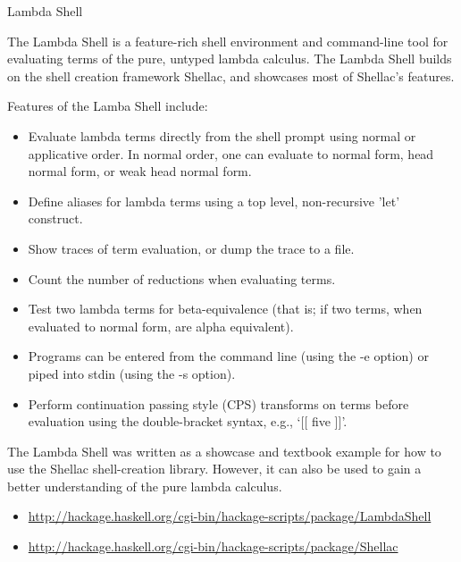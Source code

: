 \documentclass{article}
\begin{document}
\begin{hcarentry}{Lambda Shell}
\makeheader

The Lambda Shell is a feature-rich shell environment and command-line
tool for evaluating terms of the pure, untyped lambda calculus.  The Lambda
Shell builds on the shell creation framework Shellac, and showcases
most of Shellac's features.

Features of the Lamba Shell include:

\begin{itemize}
\item Evaluate lambda terms directly from the shell prompt using
      normal or applicative order.  In normal order, one can evaluate
      to normal form, head normal form, or weak head normal form.
\item Define aliases for lambda terms using a top level, non-recursive
      'let' construct.
\item Show traces of term evaluation, or dump the trace to a file.
\item Count the number of reductions when evaluating terms.
\item Test two lambda terms for beta-equivalence (that is; if two
      terms, when evaluated to normal form, are alpha equivalent).
\item Programs can be entered from the command line (using the -e option)
      or piped into stdin (using the -s option).
\item Perform continuation passing style (CPS) transforms on terms before
      evaluation using the double-bracket syntax, e.g.,  `[[ five ]]'.
\end{itemize}


The Lambda Shell was written as a showcase and textbook
example for how to use the Shellac shell-creation library.
However, it can also be used to gain a better understanding
of the pure lambda calculus.


\FurtherReading
\begin{itemize}
\item \url{http://hackage.haskell.org/cgi-bin/hackage-scripts/package/LambdaShell}
\item \url{http://hackage.haskell.org/cgi-bin/hackage-scripts/package/Shellac}
\end{itemize}
\end{hcarentry}
\end{document}
